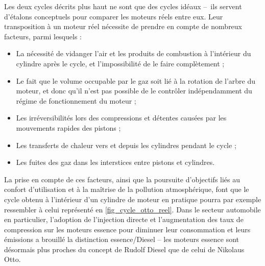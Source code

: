 		Les deux cycles décrits plus haut ne sont que des cycles idéaux --\ ils servent d’étalons conceptuels pour comparer les moteurs réels entre eux. Leur transposition à un moteur réel nécessite de prendre en compte de nombreux facteurs, parmi lesquels :
		\begin{itemize}
			\item La nécessité de vidanger l’air et les produits de combustion à l’intérieur du cylindre après le cycle, et l’impossibilité de le faire complètement ;
			\item Le fait que le volume occupable par le gaz soit lié à la rotation de l’arbre du moteur, et donc qu’il n’est pas possible de le contrôler indépendamment du régime de fonctionnement du moteur ;
			\item Les irréversibilités lors des compressions et détentes causées par les mouvements rapides des pistons ;
			\item Les transferts de chaleur vers et depuis les cylindres pendant le cycle ;
			\item Les fuites des gaz dans les interstices entre pistons et cylindres.
		\end{itemize}

		La prise en compte de ces facteurs, ainsi que la poursuite d’objectifs liés au confort d’utilisation et à la maîtrise de la pollution atmosphérique, font que le cycle obtenu à l’intérieur d’un cylindre de moteur en pratique pourra par exemple ressembler à celui représenté en \cref{fig_cycle_otto_reel}. Dans le secteur automobile en particulier, l’adoption de l’injection directe et l’augmentation des taux de compression sur les moteurs essence pour diminuer leur consommation et leurs émissions a brouillé la distinction essence/Diesel -- les moteurs essence sont désormais plus proches du concept de Rudolf Diesel que de celui de Nikolaus Otto.

